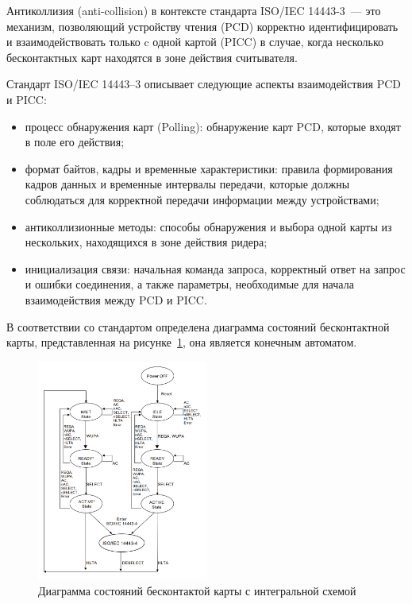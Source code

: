 Антиколлизия (anti-collision) в контексте стандарта ISO/IEC 14443-3~--- это механизм, позволяющий устройству чтения (PCD) корректно идентифицировать и взаимодействовать только c одной картой (PICC) в случае, когда несколько бесконтактных карт находятся в зоне действия считывателя.

Стандарт ISO/IEC 14443--3 описывает следующие аспекты взаимодействия PCD и PICC:

\begin{itemize}
    \item процесс обнаружения карт (Polling): обнаружение карт PCD, которые входят в поле его действия;
    \item формат байтов, кадры и временные характеристики: правила формирования кадров данных и временные интервалы передачи, которые должны соблюдаться для корректной передачи информации между устройствами;
    \item антиколлизионные методы: способы обнаружения и выбора одной карты из нескольких, находящихся в зоне действия ридера;
    \item инициализация связи: начальная команда запроса, корректный ответ на запрос и ошибки соединения, а также параметры, необходимые для начала взаимодействия между PCD и PICC.
\end{itemize}

В соответствии со стандартом определена диаграмма состояний бесконтактной карты, представленная на рисунке~\ref{fig:picc_states}, она является конечным автоматом.

\begin{figure}[H]
    \centering
    \includegraphics[width=0.5\textwidth]{images/research/picc_states}
    \caption{\centering Диаграмма состояний бесконтактой карты с интегральной схемой}
    \label{fig:picc_states}
\end{figure}

